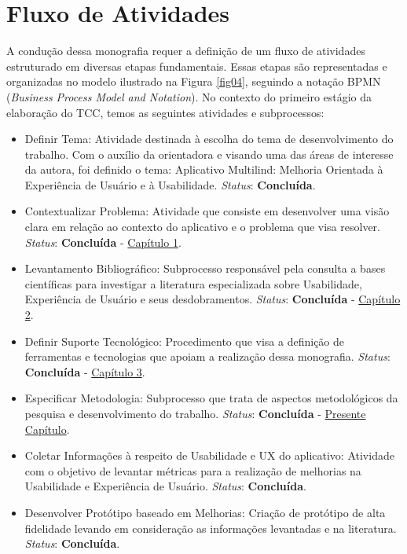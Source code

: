 \section{Fluxo de Atividades}
\label{sec:Fluxo de Atividades}
A condução dessa monografia requer a definição de um fluxo de atividades estruturado em diversas etapas fundamentais. Essas etapas são representadas e organizadas no modelo ilustrado na Figura \ref{fig04}, seguindo a notação BPMN (\textit{Business Process Model and Notation}). 
No contexto do primeiro estágio da elaboração do TCC, temos as seguintes atividades e subprocessos:

\begin{itemize}
	\item Definir Tema: Atividade destinada à escolha do tema de desenvolvimento do trabalho. Com o auxílio da orientadora e visando uma das áreas de interesse da autora, foi definido o tema: Aplicativo Multilind: Melhoria Orientada à
	Experiência de Usuário e à Usabilidade. \textit{Status}: \textbf{Concluída}.
	\item Contextualizar Problema: Atividade que consiste em desenvolver uma visão clara em relação ao contexto do aplicativo e o problema que visa resolver. \textit{Status}: \textbf{Concluída} - \hyperref[chap:Introducao]{Capítulo 1}.
	\item Levantamento Bibliográfico: Subprocesso responsável pela consulta a bases científicas para investigar a literatura especializada sobre Usabilidade, Experiência de Usuário e seus desdobramentos. \textit{Status}: \textbf{Concluída} - \hyperref[chap:Referencial]{Capítulo 2}.
	\item Definir Suporte Tecnológico: Procedimento que visa a definição de ferramentas e tecnologias que apoiam a realização dessa monografia. \textit{Status}: \textbf{Concluída} - \hyperref[chap:ReferencialTech]{Capítulo 3}.
	\item Especificar Metodologia: Subprocesso que trata de aspectos metodológicos da pesquisa e desenvolvimento do trabalho. \textit{Status}: \textbf{Concluída} - \hyperref[chap:Metodologia]{Presente Capítulo}.
	\item Coletar Informações à respeito de Usabilidade e UX do aplicativo: Atividade com o objetivo de levantar métricas para a realização de melhorias na Usabilidade e Experiência de Usuário. \textit{Status}: \textbf{Concluída}.
	\item Desenvolver Protótipo baseado em Melhorias: Criação de protótipo de alta fidelidade levando em consideração as informações levantadas e na literatura. \textit{Status}: \textbf{Concluída}.

\end{itemize}
